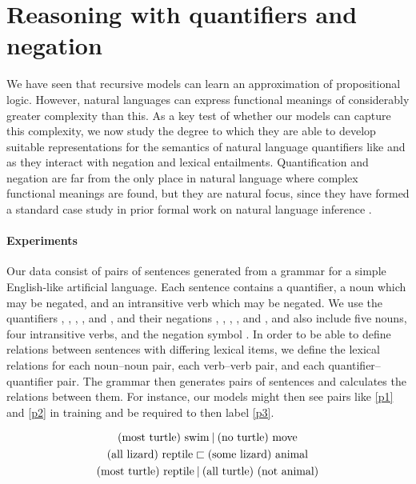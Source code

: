 \section{Reasoning with quantifiers and negation}\label{sec:quantifiers}

We have seen that recursive models can learn an approximation of propositional
logic.  However, natural languages can express functional meanings of
considerably greater complexity than this.  As a key test of whether our models 
can capture this complexity, we now study the degree to which they are able to
develop suitable representations for the semantics of natural language
quantifiers like  and  as they interact with negation and lexical entailments. Quantification 
and negation are far from the only place in natural language where complex functional meanings
are found, but they are natural focus, since they have
formed a standard case study in prior formal work on natural
language inference \cite{Icard:Moss:2013:LILT}.

\paragraph{Experiments}
Our data consist of pairs of sentences generated
from a grammar for a simple English-like artificial language.
Each sentence contains a quantifier, a noun
which may be negated, and an intransitive verb which may be
negated. We use the quantifiers , , ,
, and , and their negations , ,
, , and , and also
include five nouns, four intransitive verbs, and the negation symbol
. In order to be able to define relations between sentences
with differing lexical items, we define the lexical relations for
each noun--noun pair, each verb--verb pair, and each
quantifier--quantifier pair. The grammar then generates pairs of
sentences and calculates the relations
between them.  
For instance, our models might then see
pairs like \eqref{p1} and \eqref{p2} in training and be required to 
then label \eqref{p3}.

\vspace{-0.6cm}
\begin{gather}
  \text{(most turtle) swim} \mathbin{|} \text{(no turtle) move}\label{p1}
  \\
  \text{(all lizard) reptile} \sqsubset  \text{(some lizard) animal}\label{p2}
  \\
  \text{(most turtle) reptile} \mathbin{|} \text{(all turtle) (not animal)}\label{p3}
\end{gather}

